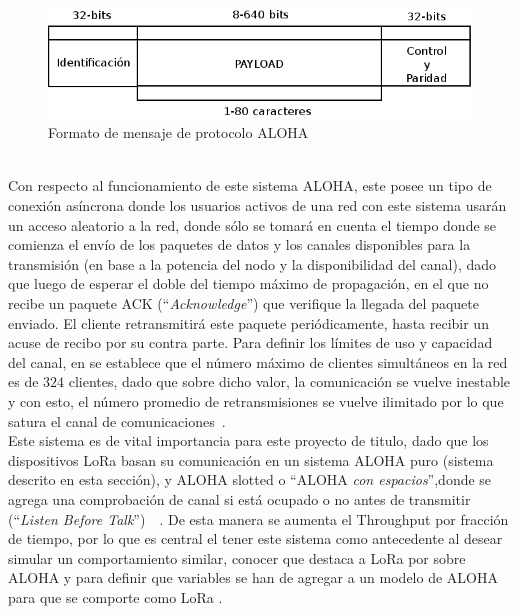 \begin{justify}
\begin{figure}[!ht]
\includegraphics[scale=0.5]{images/alohamsg.png}
\caption{Formato de mensaje de protocolo ALOHA}
\label{aloha:msg}
\end{figure}\\
Con respecto al funcionamiento de este sistema ALOHA, este posee un tipo de conexión asíncrona donde los usuarios activos de una red con este sistema usarán un acceso aleatorio a la red, donde sólo se tomará en cuenta el tiempo donde se comienza el envío de los paquetes de datos y los canales disponibles para la transmisión (en base a la potencia del nodo y la disponibilidad del canal), dado que luego de esperar el doble del tiempo máximo de propagación, en el que  no recibe un paquete ACK (``\textit{Acknowledge}'') que verifique la llegada del paquete enviado. El cliente retransmitirá este paquete periódicamente, hasta recibir un acuse de recibo por su contra parte. Para definir los límites de uso y capacidad del canal, en \cite{NORMAN} se establece que el número máximo de clientes simultáneos en la red es de $324$ clientes, dado que sobre dicho valor, la comunicación se vuelve inestable y con esto, el número promedio de retransmisiones se vuelve ilimitado por lo que satura el canal de comunicaciones~\cite{NORMAN}.\\
Este sistema es de vital importancia para este proyecto de titulo, dado que los dispositivos LoRa basan su comunicación en un sistema ALOHA puro (sistema descrito en esta sección), y ALOHA slotted o ``ALOHA \textit{con espacios}'',donde se agrega una comprobación de canal si está ocupado o no antes de transmitir (``\textit{Listen Before Talk}'')~\cite{Sornin}~\cite{Sornin2}. De esta manera se aumenta el Throughput por fracción de tiempo, por lo que es central el tener este sistema como antecedente al desear simular un comportamiento similar, conocer que destaca a LoRa por sobre ALOHA y para definir que variables se han de agregar a un modelo de ALOHA para que se comporte como LoRa .

\end{justify}
